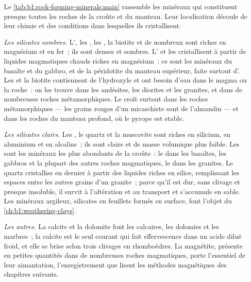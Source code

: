 Le \cref{tab:b1:rock-forming-minerals:main} rassemble les minéraux qui
constituent presque toutes les roches de la croûte et du manteau. Leur
localisation découle de leur chimie et des conditions dans lesquelles ils
cristallisent.

\emph{Les silicates sombres.} L', les , les , la
biotite et de nombreux  sont riches en magnésium et en fer~; ils sont
denses et sombres. L' et les  cristallisent à partir de liquides
magmatiques chauds riches en magnésium~: ce sont les minéraux du basalte et du
gabbro, et de la péridotite du manteau supérieur, faite surtout d'. Les
 et la biotite contiennent de l'hydroxyle et ont besoin d'eau dans le
magma ou la roche~: on les trouve dans les andésites, les diorites et les
granites, et dans de nombreuses roches métamorphiques. Le  croît surtout
dans les roches métamorphiques --- les grains rouges d'un micaschiste sont de
l'almandin --- et dans les roches du manteau profond, où le pyrope est stable.

\emph{Les silicates clairs.} Les , le quartz et la muscovite sont
riches en silicium, en aluminium et en alcalins~; ils sont clairs et de masse
volumique plus faible. Les  sont les minéraux les plus abondants de la
croûte~: le  dans les basaltes, les gabbros et la plupart des autres
roches magmatiques, le  dans les granites. Le quartz cristallise
en dernier à partir des liquides riches en silice, remplissant les espaces entre
les autres grains d'un granite~; parce qu'il est dur, sans clivage et presque
insoluble, il survit à l'altération et au transport et s'accumule en sable. Les
minéraux argileux, silicates en feuillets formés en surface, font l'objet du
\cref{ch:b1:weathering-clays}.

\emph{Les autres.} La calcite et la dolomite font les calcaires, les dolomies et
les marbres~; la calcite est le seul  courant qui fait effervescence dans
un acide dilué froid, et elle se brise selon trois clivages en rhomboèdres. La
magnétite, présente en petites quantités dans de nombreuses roches magmatiques,
porte l'essentiel de leur aimantation, l'enregistrement que lisent les méthodes
magnétiques des chapitres suivants.


